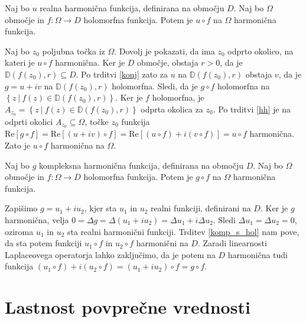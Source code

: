 \documentclass[mat1, tisk]{fmfdelo}
\begin{document}
    \begin{trditev}
        \label{komp_s_hol}
        Naj bo $u$ realna harmonična funkcija, definirana na območju $D$. Naj bo $\Omega$ območje in $f : \Omega \to D$ holomorfna funkcija. Potem je $u \circ f$ na $\Omega$ harmonična funkcija.
    \end{trditev}
    \begin{dokaz}
        Naj bo $z_0$ poljubna točka iz $\Omega$. Dovolj je pokazati, da ima $z_0$ odprto okolico, na kateri je $u \circ f$ harmonična. Ker je $D$ območje, obstaja $r > 0$, da je \mbox{$\mathbb{D}(f(z_0), r) \subseteq D$}. 
        Po trditvi \ref{konj} zato za $u$ na $\mathbb{D}(f(z_0),r)$ obstaja $v$, da je $g = u + iv$ na $\mathbb{D}(f(z_0), r)$ holomorfna. Sledi, da je $g \circ f$ holomorfna na $\left\{z~|~ f(z) \in \mathbb{D}(f(z_0), r)\right\}$.
        Ker je $f$ holomorfna, je $A_{z_0} = \left\{z~|~ f(z) \in \mathbb{D}(f(z_0), r)\right\}$ odprta okolica za $z_0$. Po trditvi \ref{hh} je na odprti okolici $A_{z_0} \subseteq \Omega$, točke $z_0$ funkcija $\text{Re}[g \circ f] = \text{Re}[(u + iv)\circ f] = \text{Re}[(u \circ f) + i(v \circ f)] = u \circ f$ harmonična. 
        Zato je $u \circ f$ harmonična na $\Omega$.
    \end{dokaz}

    \begin{posledica}
        \label{komp_s_hol_komp}
        Naj bo $g$ kompleksna harmonična funkcija, definirana na območju $D$. Naj bo $\Omega$ območje in $f : \Omega \to D$ holomorfna funkcija. Potem je $g \circ f$ na $\Omega$ harmonična funkcija.
    \end{posledica}
    \begin{dokaz}
        Zapišimo $g = u_1 + i u_2$, kjer sta $u_1$ in $u_2$ realni funkciji, definirani na $D$. 
        Ker je $g$ harmonična, velja $ 0 = \Delta g = \Delta(u_1 + i u_2) = \Delta u_1 + i \Delta u_2$. Sledi $\Delta u_1 = \Delta u_2 = 0$, oziroma $u_1$ in $u_2$ sta realni harmonični funkciji.
        Trditev \ref{komp_s_hol} nam pove, da sta potem funkciji $u_1 \circ f$ in $u_2 \circ f$ harmonični na $D$. Zaradi linearnosti Laplaceovega operatorja lahko zaključimo, da je potem na $D$ harmonična tudi funkcija $(u_1 \circ f) + i (u_2 \circ f) = (u_1 + i u_2) \circ f = g \circ f$.
    \end{dokaz}

\section{Lastnost povprečne vrednosti}
\end{document}
